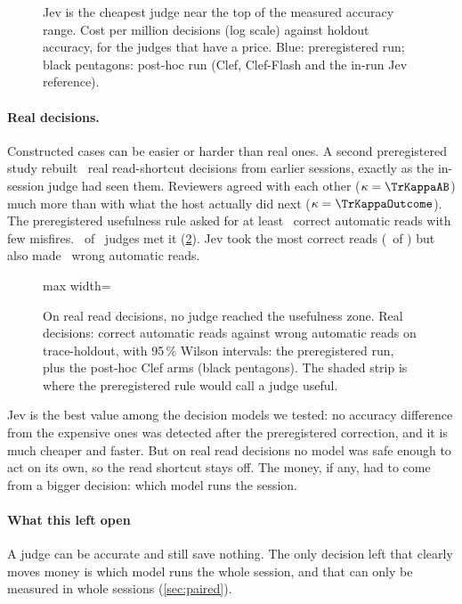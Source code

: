 \begin{figure}[htbp]
\centering
{}\par\smallskip

\caption{Jev is the cheapest judge near the top of the measured accuracy range. Cost per million decisions (log scale) against holdout accuracy, for the judges that have a price.
Blue: preregistered run; black pentagons: post-hoc run (Clef, Clef-Flash and the in-run Jev reference).}
\label{fig:costacc}
\end{figure}

\paragraph{Real decisions.} Constructed cases can be easier or harder than real ones. A second preregistered study
rebuilt \TrN\ real read-shortcut decisions from earlier sessions, exactly as the in-session judge had seen them.
Reviewers agreed with each other ($\kappa = \TrKappaAB$) much more than with what the host actually did next
($\kappa = \TrKappaOutcome$). The preregistered usefulness rule asked for at least \TrUsefulMinReads\ correct
automatic reads with few misfires. \TrNUseful\ of \NumBase\ judges met it (\cref{fig:reads}). Jev took the most
correct reads (\TrJevReads\ of \TrReadCases) but also made \TrJevWaK\ wrong automatic reads.

\begin{figure}[htbp]
\centering
\begin{adjustbox}{max width=\linewidth}\end{adjustbox}
\caption{On real read decisions, no judge reached the usefulness zone. Real decisions: correct automatic reads against wrong automatic reads on trace-holdout, with 95\,\% Wilson
intervals: the preregistered run, plus the post-hoc Clef arms (black pentagons). The shaded strip is where the
preregistered rule would call a judge useful.}
\label{fig:reads}
\end{figure}



\begin{keyidea}
Jev is the best value among the decision models we tested: no accuracy difference from the expensive ones was
detected after the preregistered correction, and it is much cheaper and faster. But on real read decisions no model was safe enough to act on its own, so the read shortcut stays
off. The money, if any, had to come from a bigger decision: which model runs the session.
\end{keyidea}

\paragraph{What this left open} A judge can be accurate and still save nothing. The only decision left that clearly
moves money is which model runs the whole session, and that can only be measured in whole sessions
(\cref{sec:paired}).
